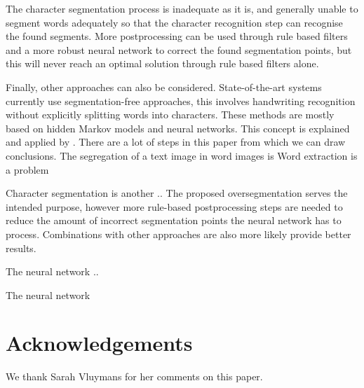 \documentclass{article}
\begin{document}
The character segmentation process is inadequate as it is, and generally unable to segment words adequately so that the character recognition step can recognise the found segments.
More postprocessing can be used through rule based filters and a more robust neural network to correct the found segmentation points, but this will never reach an optimal solution through rule based filters alone.

Finally, other approaches can also be considered.
State-of-the-art systems currently use segmentation-free approaches, this involves handwriting recognition without explicitly splitting words into characters. These methods are mostly based on hidden Markov models and neural networks.
This concept is explained and applied by \citep{presham}.
There are a lot of steps in this paper from which we can draw conclusions.
The segregation of a text image in word images is
Word extraction is a problem

Character segmentation is another ..
The proposed oversegmentation serves the intended purpose, however more rule-based postprocessing steps are needed to reduce the amount of incorrect segmentation points the neural network has to process.
Combinations with other approaches are also more likely provide better results.

The neural network ..

The neural network
\section*{Acknowledgements}
We thank Sarah Vluymans for her comments on this paper.


\end{document}
